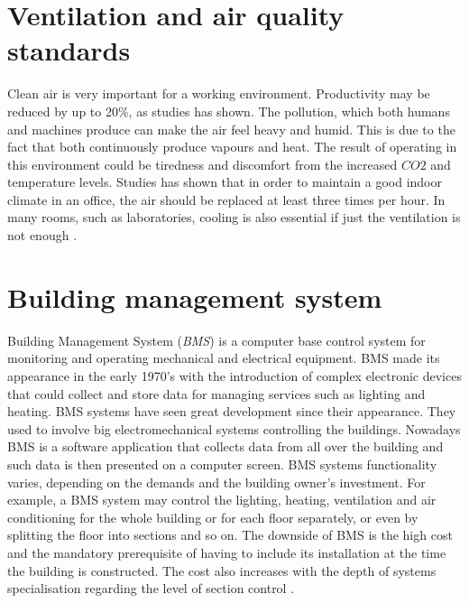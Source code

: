 \documentclass[12pt,a4paper,draft]{report}
\begin{document}
\section {Ventilation and air quality standards}
Clean air is very important for a working environment. Productivity may be reduced by up to 20\%, as studies has shown. The pollution, which both humans and machines produce can make the air feel heavy and humid. This is due to the fact that both continuously produce vapours and heat. The result of operating in this environment could be tiredness and discomfort from the increased $CO2$ and temperature levels. Studies has shown that in order to maintain a good indoor climate in an office, the air should be replaced at least three times per hour. In many rooms, such as laboratories, cooling is also essential if just the ventilation is not enough \cite{website:ventilation}.
%
\section{Building management system}
Building Management System (\textit{BMS}) is a computer base control system for monitoring and operating mechanical and electrical equipment.
BMS made its appearance in the early 1970's with the introduction of complex electronic devices that could collect and store data for managing services such as lighting and heating. BMS systems have seen great development since their appearance.
They used to involve big electromechanical systems controlling the buildings.
Nowadays BMS is a software application that collects data from all over the building and such data is then presented on a computer screen.
BMS systems functionality varies, depending on the demands and the building owner's investment.
For example, a BMS system may control the lighting, heating, ventilation and air conditioning for the whole building or for each floor separately, or even by splitting the floor into sections and so on.
The downside of BMS is the high cost and the mandatory prerequisite of having to include its installation at the time the building is constructed.
The cost also increases with the depth of systems specialisation regarding the level of section control \cite{website:bms}.
%
\end{document}
